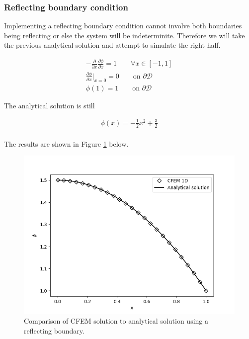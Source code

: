 \documentclass[11pt,letterpaper,titlepage]{article}
\newcommand{\bOmega}{\mathcal{D}}
\numberwithin{equation}{section}
\begin{document}
\subsubsection{Reflecting boundary condition}
Implementing a reflecting boundary condition cannot involve both boundaries being reflecting or else the system will be indeterminite. Therefore we will take the previous analytical solution and attempt to simulate the right half.

\begin{equation*}
\begin{aligned}
-\frac{\partial}{\partial x} \frac{\partial \phi}{\partial x} = 1 \quad \quad \forall x \in [-1,1] \\
\frac{\partial \phi}{\partial x}\biggr |_{x=0} = 0 \quad \quad \text{on } \partial \bOmega \\
\phi(1) = 1 \quad \quad \text{on } \partial \bOmega
\end{aligned}
\end{equation*}

The analytical solution is still

\begin{equation*}
\begin{aligned}
\phi(x) = -\frac{1}{2}x^2 + \frac{3}{2} \\
\end{aligned}
\end{equation*}

The results are shown in Figure \ref{fig:Diffusion1b} below.

\begin{figure}[H]
\centering
\includegraphics[width=0.8\linewidth]{Figures/Diffusion1b}
\caption{Comparison of CFEM solution to analytical solution using a reflecting boundary.}
\label{fig:Diffusion1b}
\end{figure}
\end{document}
